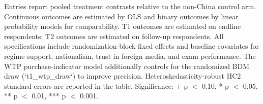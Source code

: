 \begin{table}[H]
\begin{threeparttable}
\begin{tablenotes}[flushleft]
\footnotesize
\item Entries report pooled treatment contrasts relative to the non-China control arm. Continuous outcomes are estimated by OLS and binary outcomes by linear probability models for comparability. T1 outcomes are estimated on endline respondents; T2 outcomes are estimated on follow-up respondents. All specifications include randomization-block fixed effects and baseline covariates for regime support, nationalism, trust in foreign media, and exam performance. The WTP purchase-indicator model additionally controls for the randomized BDM draw (`t1_wtp_draw`) to improve precision. Heteroskedasticity-robust HC2 standard errors are reported in the table. Significance: + p $<$ 0.10, * p $<$ 0.05, ** p $<$ 0.01, *** p $<$ 0.001.
\end{tablenotes}
\end{threeparttable}
\end{table}
